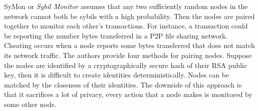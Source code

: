 SyMon\cite{jyothi2009symon} or \emph{Sybil Monitor} assumes that any two
sufficiently random nodes in the network cannot both be sybils with a high
probability. Then the nodes are paired together to monitor each other's
transactions. For instance, a transaction could be reporting the number bytes
transferred in a P2P file sharing network. Cheating occurs when a node reports
some bytes transferred that does not match its network traffic. The authors
provide four methods for pairing nodes. Suppose the nodes are identified by a
cryptographically secure hash of their RSA public key, then it is difficult to
create identities deterministically. Nodes can be matched by the closeness of
their identities. The downside of this approach is that it sacrifices a lot of
privacy, every action that a node makes is monitored by some other node.


